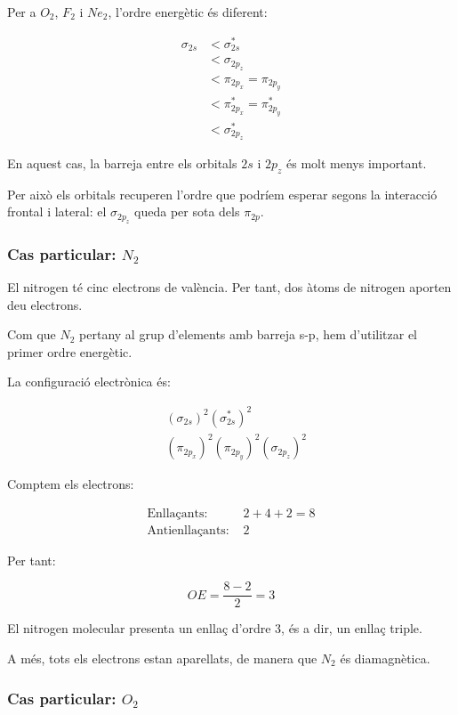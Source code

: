 \documentclass[12pt]{article}
\begin{document}
Per a \(O_2\), \(F_2\) i \(Ne_2\), l'ordre energètic és diferent:

\[
\boxed{
\begin{aligned}
\sigma_{2s}
&< \sigma^*_{2s}\\
&< \sigma_{2p_z}\\
&< \pi_{2p_x}=\pi_{2p_y}\\
&< \pi^*_{2p_x}=\pi^*_{2p_y}\\
&< \sigma^*_{2p_z}
\end{aligned}
}
\]

En aquest cas, la barreja entre els orbitals \(2s\) i \(2p_z\)
és molt menys important.

Per això els orbitals recuperen l'ordre que podríem esperar
segons la interacció frontal i lateral: el \(\sigma_{2p_z}\)
queda per sota dels \(\pi_{2p}\).

\subsubsection*{Cas particular: \(N_2\)}

El nitrogen té cinc electrons de valència. Per tant, dos àtoms
de nitrogen aporten deu electrons.

Com que \(N_2\) pertany al grup d'elements amb barreja s-p,
hem d'utilitzar el primer ordre energètic.

La configuració electrònica és:

\[
\begin{aligned}
&(\sigma_{2s})^2
(\sigma^*_{2s})^2\\
&(\pi_{2p_x})^2
(\pi_{2p_y})^2
(\sigma_{2p_z})^2
\end{aligned}
\]

Comptem els electrons:

\[
\begin{aligned}
\text{Enllaçants: }&2+4+2=8\\
\text{Antienllaçants: }&2
\end{aligned}
\]

Per tant:

\[
OE=\frac{8-2}{2}=\boxed{3}
\]

El nitrogen molecular presenta un enllaç d'ordre 3,
és a dir, un enllaç triple.

A més, tots els electrons estan aparellats, de manera que
\(N_2\) és diamagnètica.


\subsubsection*{Cas particular: \(O_2\)}
\end{document}
